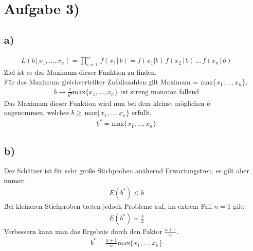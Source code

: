 \section*{Aufgabe 3)}

\subsection*{a)}
\begin{align*}
  L(b\,|\,x_1,…,x_n) = \prod \limits_{i=1}^{n}\,f(x_i\,|\,b) = f(x_1|b)\,f(x_2\,|\,b)\,…\,f(x_n\,|\,b)
\end{align*}
Ziel ist es das Maximum dieser Funktion zu finden. \\
Für das Maximum gleichverteilter Zufallszahlen gilt Maximum = max\{$x_1,…,x_n$\}.
\begin{align*}
  b \rightarrow \frac{1}{b^n}\text{max}\{x_1,…,x_n\} \ \ \text{ist streng monoton fallend}
\end{align*}
Das Maximum dieser Funktion wird nun bei dem kleinst möglichen $b$ angenommen, welches $b \ge $\,max\{$x_1,…,x_n$\} erfüllt.
\begin{align*}
  b^* = \text{max}\{x_1,…,x_n\}
\end{align*}

\subsection*{b)}
Der Schätzer ist für sehr große Stichproben anähernd Erwartungstreu, es gilt aber immer:
\begin{align*}
  E(b^*) \le b
\end{align*}
Bei kleineren Stichproben treten jedoch Probleme auf, im extrem Fall $n = 1$ gilt:
\begin{align*}
  E(b^*) = \frac{b}{2}
\end{align*}
Verbessern kann man das Ergebnis durch den Faktor $\frac{n+1}{n}$.
\begin{align*}
  b^* = \frac{n+1}{n} \text{max}\{x_1,…,x_n\}
\end{align*}
